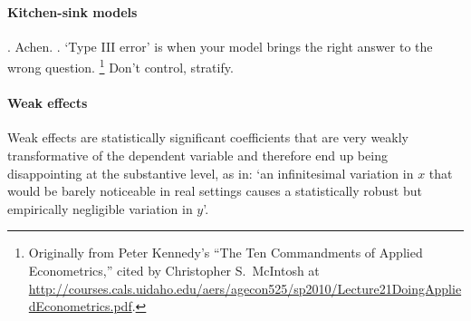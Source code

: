 \paragraph{Kitchen-sink models}. Achen.  \href{http://polmeth.wustl.edu/mediaDetail.php?docId=1246}{}. `Type III error' is when your model brings the right answer to the wrong question.%
     \footnote{Originally from Peter Kennedy's ``The Ten Commandments of Applied Econometrics,'' cited by Christopher S.~McIntosh at \url{http://courses.cals.uidaho.edu/aers/agecon525/sp2010/Lecture21DoingAppliedEconometrics.pdf}.} %
     Don't control, stratify.

\paragraph{Weak effects} Weak effects are statistically significant coefficients that are very weakly transformative of the dependent variable and therefore end up being disappointing at the substantive level, as in: `an infinitesimal variation in $x$ that would be barely noticeable in real settings causes a statistically robust but empirically negligible variation in $y$'.%



  

